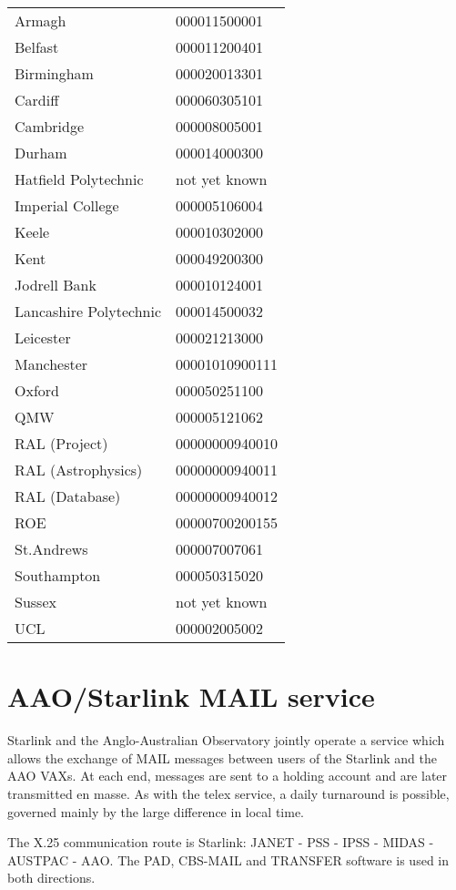 \begin{center}\begin{tabular}{l@{\hspace{1cm}}l}
Armagh & 000011500001 \\
Belfast & 000011200401 \\
Birmingham & 000020013301 \\
Cardiff & 000060305101 \\
Cambridge & 000008005001 \\
Durham & 000014000300 \\
Hatfield Polytechnic & not yet known \\
Imperial College & 000005106004 \\
Keele & 000010302000 \\
Kent & 000049200300 \\
Jodrell Bank & 000010124001 \\
Lancashire Polytechnic & 000014500032 \\
Leicester & 000021213000 \\
Manchester & 00001010900111 \\
Oxford & 000050251100 \\
QMW & 000005121062 \\
RAL (Project) & 00000000940010 \\
RAL (Astrophysics) & 00000000940011 \\
RAL (Database) & 00000000940012 \\
ROE &00000700200155 \\
St.Andrews & 000007007061 \\
Southampton & 000050315020 \\
Sussex & not yet known \\
UCL & 000002005002
\end{tabular}\end{center}

\section{AAO/Starlink MAIL service}
\label{aao-mail}

Starlink and the Anglo-Australian Observatory jointly operate a service which
allows the exchange of MAIL messages between users of the Starlink and the AAO
VAXs.
At each end, messages are sent to a holding account and are later transmitted
en masse.
As with the telex service, a daily turnaround is possible, governed mainly by
the large difference in local time.

The X.25 communication route is Starlink: JANET - PSS - IPSS - MIDAS - AUSTPAC
- AAO.
The PAD, CBS-MAIL and TRANSFER software is used in both directions.
